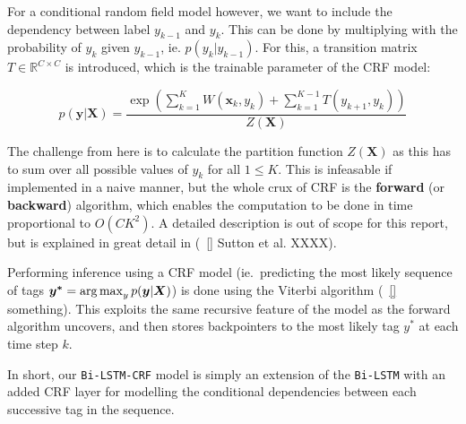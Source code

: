 For a conditional random field model however, we want to include the
dependency between label $y_{k-1}$ and $y_{k}$. This can be done by multiplying
with the probability of $y_{k}$ given $y_{k-1}$, ie. $p(y_{k}|y_{k-1})$. For
this, a transition matrix $T \in \mathbb{R}^{C \times C}$ is introduced, which 
is the trainable parameter of the CRF model:

\begin{equation*}
p(\bm{y}|\bm{X}) = \frac{\exp( \sum_{k=1}^{K} W(\bm{x}_k, y_{k}) +
                    \sum_{k=1}^{K-1} T(y_{k+1}, y_{k}) )}{Z(\bm{X})}
\end{equation*}

The challenge from here is to calculate the partition function $Z(\bm{X})$ as
this has to sum over all possible values of $y_{k}$ for all $1 \leq K$. This is
infeasable if implemented in a naive manner, but the whole crux of CRF is the
\textbf{forward} (or \textbf{backward}) algorithm, which enables the computation
to be done in time proportional to $O(CK^{2})$. A detailed description is out of
scope for this report, but is explained in great detail in (~\ref{} Sutton et
al. XXXX).

Performing inference using a CRF model (ie.\ predicting the most likely sequence
of tags $\bm{y^{*}} = \operatorname*{arg\,max}_{y}p(\bm{y}|\bm{X})$) is done using the Viterbi
algorithm (~\ref{} something). This exploits the same recursive feature of the
model as the forward algorithm uncovers, and then stores backpointers to the
most likely tag $y^{*}$ at each time step $k$.

In short, our \texttt{Bi-LSTM-CRF} model is simply an extension of the
\texttt{Bi-LSTM} with an added CRF layer for modelling the conditional
dependencies between each successive tag in the sequence. 










